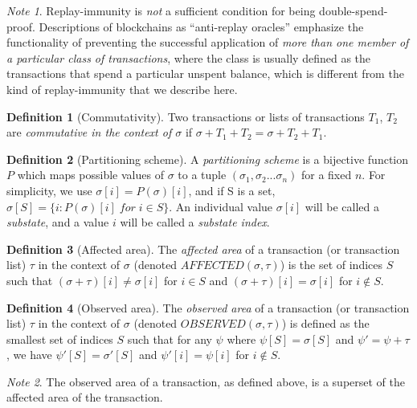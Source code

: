 \documentclass[11pt,a4paper]{report}
\theoremstyle{plain}
\theoremstyle{definition}
\newtheorem{defn}{Definition}[chapter]
\theoremstyle{remark}
\newtheorem*{note}{Note}
\begin{document}
\begin{note}
Replay-immunity is \emph{not} a sufficient condition for being double-spend-proof. Descriptions of blockchains as ``anti-replay oracles'' \cite{gmaxwell} emphasize the functionality of preventing the successful application of \emph{more than one member of a particular class of transactions}, where the class is usually defined as the transactions that spend a particular unspent balance, which is different from the kind of replay-immunity that we describe here.
\end{note}

\begin{defn}[Commutativity]
Two transactions or lists of transactions $T_1$, $T_2$ are \emph{commutative in the context of $\sigma$} if $\sigma + T_1 + T_2 = \sigma + T_2 + T_1$.
\end{defn}

\begin{defn}[Partitioning scheme]
A \emph{partitioning scheme} is a bijective function $P$ which maps possible values of $\sigma$ to a tuple $(\sigma_1, \sigma_2 ... \sigma_n)$ for a fixed $n$. For simplicity, we use $\sigma[i] = P(\sigma)[i]$, and if S is a set, $\sigma[S] = \{i: P(\sigma)[i] \; for \; i \in S\}$. An individual value $\sigma[i]$ will be called a \emph{substate}, and a value $i$ will be called a \emph{substate index}.
\end{defn}

\begin{defn}[Affected area]
The \emph{affected area} of a transaction (or transaction list) $\tau$ in the context of $\sigma$ (denoted $AFFECTED(\sigma, \tau)$) is the set of indices $S$ such that $(\sigma + \tau)[i] \ne \sigma[i]$ for $i \in S$ and $(\sigma + \tau)[i] = \sigma[i]$ for $i \notin S$.
\end{defn}

\begin{defn}[Observed area]
The \emph{observed area} of a transaction (or transaction list) $\tau$ in the context of $\sigma$ (denoted $OBSERVED(\sigma, \tau)$) is defined as the smallest set of indices $S$ such that for any $\psi$ where $\psi[S] = \sigma[S]$ and $\psi' = \psi + \tau$, we have $\psi'[S] = \sigma'[S]$ and $\psi'[i] = \psi[i]$ for $i \notin S$. 
\end{defn}

\begin{note}
The observed area of a transaction, as defined above, is a superset of the affected area of the transaction.
\end{note}
\end{document}

